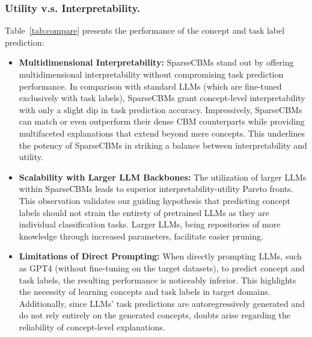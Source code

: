 \documentclass[letterpaper]{article} %
\begin{document}
\subsubsection{Utility v.s. Interpretability.}
Table~\ref{tab:compare} presents the performance of the concept and task label prediction:
\begin{itemize}
    \item \textbf{Multidimensional Interpretability:} SparseCBMs stand out by offering multidimensional interpretability without compromising task prediction performance. In comparison with standard LLMs (which are fine-tuned exclusively with task labels), SparseCBMs grant concept-level interpretability with only a slight dip in task prediction accuracy. Impressively, SparseCBMs can match or even outperform their dense CBM counterparts while providing multifaceted explanations that extend beyond mere concepts. This underlines the potency of SparseCBMs in striking a balance between interpretability and utility.
    \item \textbf{Scalability with Larger LLM Backbones:} The utilization of larger LLMs within SparseCBMs leads to superior interpretability-utility Pareto fronts. This observation validates our guiding hypothesis that predicting concept labels should not strain the entirety of pretrained LLMs as they are individual classification tasks. Larger LLMs, being repositories of more knowledge through increased parameters, facilitate easier pruning.
    \item \textbf{Limitations of Direct Prompting:} When directly prompting LLMs, such as GPT4 (without fine-tuning on the target datasets), to predict concept and task labels, the resulting performance is noticeably inferior. This highlights the necessity of learning concepts and task labels in target domains. Additionally, since LLMs' task predictions are autoregressively generated and do not rely entirely on the generated concepts, doubts arise regarding the reliability of concept-level explanations. 
\end{itemize}
\end{document}

